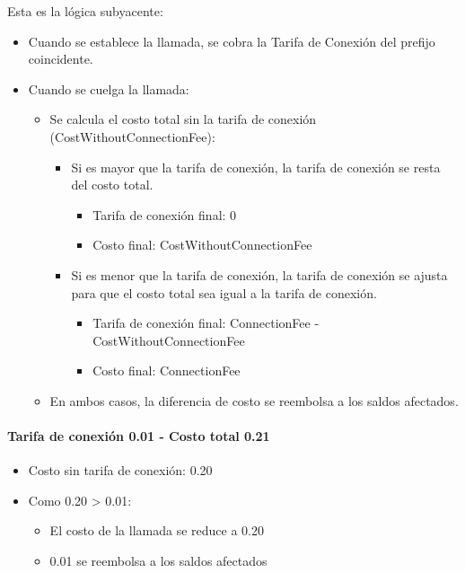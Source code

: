 \documentclass[letterpaper,10pt,spanish]{sphinxmanual}
\begin{document}
Esta es la lógica subyacente:
\begin{itemize}
\item {} 
Cuando se establece la llamada, se cobra la Tarifa de Conexión del prefijo coincidente.

\item {} 
Cuando se cuelga la llamada:
\begin{itemize}
\item {} 
Se calcula el costo total sin la tarifa de conexión (CostWithoutConnectionFee):
\begin{itemize}
\item {} 
Si es mayor que la tarifa de conexión, la tarifa de conexión se resta del costo total.
\begin{itemize}
\item {} 
Tarifa de conexión final: 0

\item {} 
Costo final: CostWithoutConnectionFee

\end{itemize}

\item {} 
Si es menor que la tarifa de conexión, la tarifa de conexión se ajusta para que el costo total sea igual a la tarifa de conexión.
\begin{itemize}
\item {} 
Tarifa de conexión final: ConnectionFee - CostWithoutConnectionFee

\item {} 
Costo final: ConnectionFee

\end{itemize}

\end{itemize}

\item {} 
En ambos casos, la diferencia de costo se reembolsa a los saldos afectados.

\end{itemize}

\end{itemize}
\paragraph{Tarifa de conexión 0.01 - Costo total 0.21}
\begin{itemize}
\item {} 
Costo sin tarifa de conexión: 0.20

\item {} 
Como 0.20 \textgreater{} 0.01:
\begin{itemize}
\item {} 
El costo de la llamada se reduce a 0.20

\item {} 
0.01 se reembolsa a los saldos afectados

\end{itemize}

\end{itemize}
\end{document}

